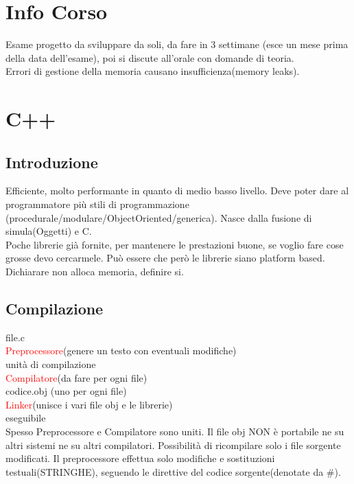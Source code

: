 \chapter{Info Corso}
Esame progetto da sviluppare da soli, da fare in 3 settimane (esce un mese prima della data dell’esame), poi si discute all’orale con domande di teoria.\\
Errori di gestione della memoria causano insufficienza(memory leaks).

\chapter{C++}
\section{Introduzione}
Efficiente, molto performante in quanto di medio basso livello.
Deve poter dare al programmatore più stili di programmazione (procedurale/modulare/ObjectOriented/generica). Nasce dalla fusione di simula(Oggetti) e C.\\
Poche librerie già fornite, per mantenere le prestazioni buone, se voglio fare cose grosse devo cercarmele. Può essere che però le librerie siano platform based.
Dichiarare non alloca memoria, definire si.

\section{Compilazione}
\textcolor{dkgreen}{file.c}\\
\textcolor{red}{Preprocessore}(genere un testo con eventuali modifiche)\\
\textcolor{dkgreen}{unità di compilazione}\\
\textcolor{red}{Compilatore}(da fare per ogni file)\\
\textcolor{dkgreen}{codice.obj} (uno per ogni file)\\
\textcolor{red}{Linker}(unisce i vari file obj e le librerie)\\
\textcolor{dkgreen}{eseguibile}\\

Spesso Preprocessore e Compilatore sono uniti. Il file obj NON è portabile ne su altri sistemi  ne su altri compilatori. Possibilità di ricompilare solo i file sorgente modificati.
Il preprocessore effettua solo modifiche e sostituzioni testuali(STRINGHE), seguendo le direttive del codice sorgente(denotate da \#).

